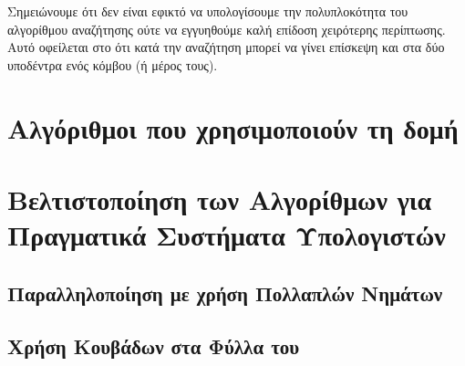 Σημειώνουμε ότι δεν είναι εφικτό να υπολογίσουμε την πολυπλοκότητα 
του αλγορίθμου αναζήτησης ούτε να εγγυηθούμε καλή επίδοση 
χειρότερης περίπτωσης. 
Αυτό οφείλεται στο ότι κατά την αναζήτηση μπορεί να γίνει 
επίσκεψη και στα δύο υποδέντρα ενός κόμβου (ή μέρος τους).

\section{Αλγόριθμοι που χρησιμοποιούν τη δομή }

\section{Βελτιστοποίηση των Αλγορίθμων για Πραγματικά Συστήματα Υπολογιστών}
\subsection{Παραλληλοποίηση με χρήση Πολλαπλών Νημάτων }
\subsection{Χρήση Κουβάδων στα Φύλλα του }